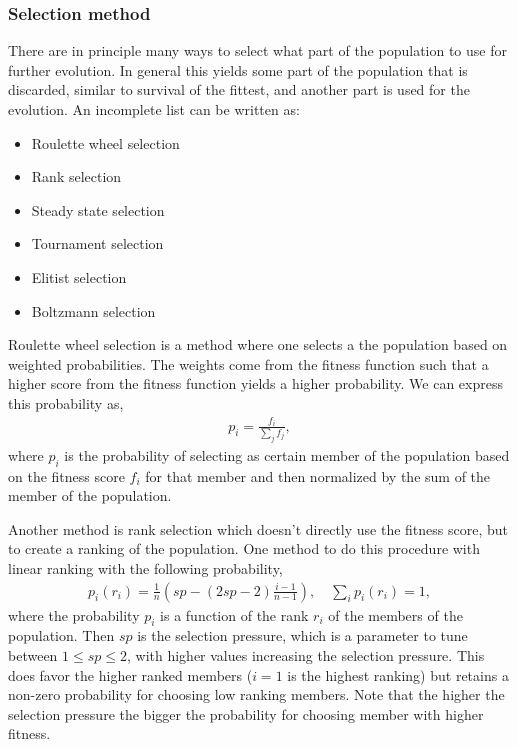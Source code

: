 \documentclass[12pt,a4paper]{article} %
\numberwithin{equation}{section}
\newcommand{\paa}[1]{\left(#1\right)}
\begin{document}
		\subsubsection{Selection method}
			There are in principle many ways to select what part of the population to use for further evolution. In general this yields some part of the population that is discarded, similar to survival of the fittest, and another part is used for the evolution. An incomplete list can be written as:
			\begin{itemize}
				\item Roulette wheel selection
				\item Rank selection
				\item Steady state selection
				\item Tournament selection
				\item Elitist selection
				\item Boltzmann selection
			\end{itemize}
		
			Roulette wheel selection is a method where one selects a the population based on weighted probabilities. The weights come from the fitness function such that a higher score from the fitness function yields a higher probability. We can express this probability as,
			\begin{gather}
				p_i = \frac{f_i}{\sum_j f_j},
			\end{gather}
			where $p_i$ is the probability of selecting as certain member of the population based on the fitness score $f_i$ for that member and then normalized by the sum of the member of the population.
			
			Another method is rank selection which doesn't directly use the fitness score, but to create a ranking of the population. One method to do this procedure with linear ranking with the following probability,
			\begin{gather}
				p_i (r_i) = \frac{1}{n}\paa{sp - \paa{2sp -2}\frac{i-1}{n-1}}, \quad \sum_i p_i (r_i)  = 1,
			\end{gather}
			where the probability $p_i$ is a function of the rank $r_i$ of the members of the population. Then $sp$ is the selection pressure, which is a parameter to tune between $1 \le sp \le 2$, with higher values increasing the selection pressure. This does favor the higher ranked members ($i=1$ is the highest ranking) but retains a non-zero probability for choosing low ranking members. Note that the higher the selection pressure the bigger the probability for choosing member with higher fitness.
			
\end{document}
